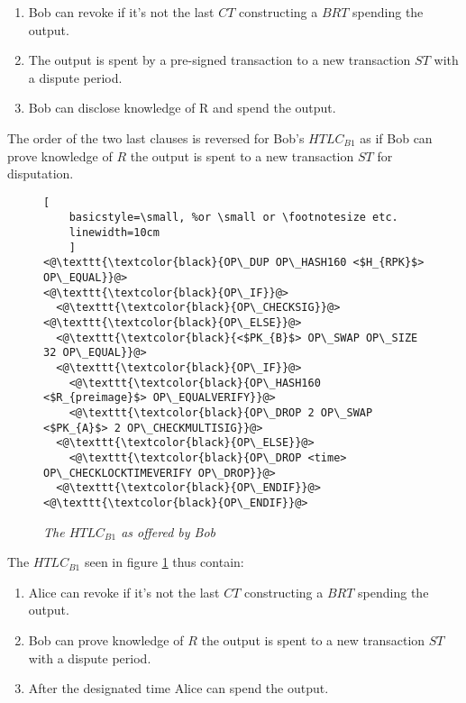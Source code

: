 \begin{enumerate}
	\item Bob can revoke if it's not the last $CT$ constructing a $BRT$ spending the output.
	\item The output is spent by a pre-signed transaction to a new transaction $ST$ with a dispute period.
	\item Bob can disclose knowledge of R and spend the output.
\end{enumerate}

The order of the two last clauses is reversed for Bob's $HTLC_{B1}$ as if Bob can prove knowledge of $R$ the output is spent to a new transaction $ST$ for disputation.
\newpage
\begin{figure}[hbt!]
	
	\centering
	
	\begin{lstlisting}[
	basicstyle=\small, %or \small or \footnotesize etc.
	linewidth=10cm
	]
<@\texttt{\textcolor{black}{OP\_DUP OP\_HASH160 <$H_{RPK}$> OP\_EQUAL}}@>
<@\texttt{\textcolor{black}{OP\_IF}}@>
  <@\texttt{\textcolor{black}{OP\_CHECKSIG}}@>
<@\texttt{\textcolor{black}{OP\_ELSE}}@>
  <@\texttt{\textcolor{black}{<$PK_{B}$> OP\_SWAP OP\_SIZE 32 OP\_EQUAL}}@>
  <@\texttt{\textcolor{black}{OP\_IF}}@>
    <@\texttt{\textcolor{black}{OP\_HASH160 <$R_{preimage}$> OP\_EQUALVERIFY}}@> 
    <@\texttt{\textcolor{black}{OP\_DROP 2 OP\_SWAP <$PK_{A}$> 2 OP\_CHECKMULTISIG}}@>  
  <@\texttt{\textcolor{black}{OP\_ELSE}}@> 
    <@\texttt{\textcolor{black}{OP\_DROP <time> OP\_CHECKLOCKTIMEVERIFY OP\_DROP}}@> 	
  <@\texttt{\textcolor{black}{OP\_ENDIF}}@>
<@\texttt{\textcolor{black}{OP\_ENDIF}}@>
	\end{lstlisting}
	
	\caption{\textit{ The $HTLC_{B1}$ as offered by Bob
	}}
	\label{fig:bob:HTLC}
\end{figure}

The $HTLC_{B1}$ seen in figure \ref{fig:bob:HTLC} thus contain:

\begin{enumerate}
	\item Alice can revoke if it's not the last $CT$ constructing a $BRT$ spending the output.
	\item Bob can prove knowledge of $R$ the output is spent to a new transaction $ST$ with a dispute period.
	\item After the designated time Alice can spend the output.
\end{enumerate}

